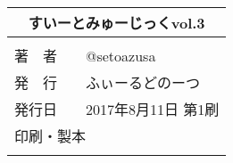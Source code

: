 \newpage
\pagestyle{fancy}
\lhead[]{}
\chead[]{}
\rhead[]{}

\begin{center}
    \vspace*{115mm} %

\begin{tabular}{l}
\multicolumn{1}{c}{\Large{すいーとみゅーじっくvol.3}}\\[3mm] %
\hline
\\[-3mm]
\hspace{2mm}\large{著　者　　}\hspace{5mm}@setoazusa\\[0mm] 
\hspace{2mm}\large{発　行　　}\hspace{5mm}ふぃーるどのーつ\\[0mm] 
\hspace{2mm}\large{発行日　　}\hspace{5mm}2017年8月11日 第1刷\\[0mm]
\hspace{2mm}\large{印刷・製本}\hspace{5mm}{日光企画}\\[0mm]
\\\hline
\end{tabular}
\end{center}
